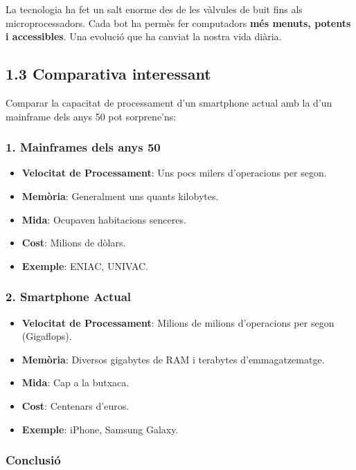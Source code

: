 \documentclass[
  12 pt,
  a4paper,
]{article}
\providecommand{\tightlist}{%
  \setlength{\itemsep}{0pt}\setlength{\parskip}{0pt}}
\begin{document}
La tecnologia ha fet un salt enorme des de les vàlvules de buit fins als
microprocessadors. Cada bot ha permès fer computadors \textbf{més
menuts, potents i accessibles}. Una evolució que ha canviat la nostra
vida diària.

\subsection{1.3 Comparativa interessant}\label{comparativa-interessant}

Comparar la capacitat de processament d'un smartphone actual amb la d'un
mainframe dels anys 50 pot sorprene'ns:

\subsubsection{1. Mainframes dels anys
50}\label{mainframes-dels-anys-50}

\begin{itemize}
\tightlist
\item
  \textbf{Velocitat de Processament}: Uns pocs milers d'operacions per
  segon.
\item
  \textbf{Memòria}: Generalment uns quants kilobytes.
\item
  \textbf{Mida}: Ocupaven habitacions senceres.
\item
  \textbf{Cost}: Milions de dòlars.
\item
  \textbf{Exemple}: ENIAC, UNIVAC.
\end{itemize}

\subsubsection{2. Smartphone Actual}\label{smartphone-actual}

\begin{itemize}
\tightlist
\item
  \textbf{Velocitat de Processament}: Milions de milions d'operacions
  per segon (Gigaflops).
\item
  \textbf{Memòria}: Diversos gigabytes de RAM i terabytes
  d'emmagatzematge.
\item
  \textbf{Mida}: Cap a la butxaca.
\item
  \textbf{Cost}: Centenars d'euros.
\item
  \textbf{Exemple}: iPhone, Samsung Galaxy.
\end{itemize}

\subsubsection{Conclusió}\label{conclusiuxf3}
\end{document}
